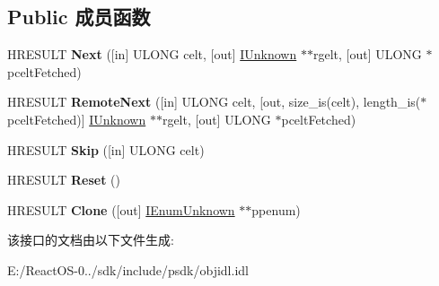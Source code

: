 \subsection*{Public 成员函数}
\begin{DoxyCompactItemize}
\item 
\mbox{\label{interface_i_enum_unknown_a34c47ba6e0eb6153b6abc51c7b7181e5}} 
H\+R\+E\+S\+U\+LT {\bfseries Next} (\mbox{[}in\mbox{]} U\+L\+O\+NG celt, \mbox{[}out\mbox{]} \hyperlink{interface_i_unknown}{I\+Unknown} $\ast$$\ast$rgelt, \mbox{[}out\mbox{]} U\+L\+O\+NG $\ast$pcelt\+Fetched)
\item 
\mbox{\label{interface_i_enum_unknown_a37f68489ee09f2c4be1ec67098a4ee74}} 
H\+R\+E\+S\+U\+LT {\bfseries Remote\+Next} (\mbox{[}in\mbox{]} U\+L\+O\+NG celt, \mbox{[}out, size\+\_\+is(celt), length\+\_\+is($\ast$pcelt\+Fetched)\mbox{]} \hyperlink{interface_i_unknown}{I\+Unknown} $\ast$$\ast$rgelt, \mbox{[}out\mbox{]} U\+L\+O\+NG $\ast$pcelt\+Fetched)
\item 
\mbox{\label{interface_i_enum_unknown_a0d9717b7381d8afc539cf6bbb3330e2f}} 
H\+R\+E\+S\+U\+LT {\bfseries Skip} (\mbox{[}in\mbox{]} U\+L\+O\+NG celt)
\item 
\mbox{\label{interface_i_enum_unknown_ab01f2f09a73e05a52f0e5164530fb61b}} 
H\+R\+E\+S\+U\+LT {\bfseries Reset} ()
\item 
\mbox{\label{interface_i_enum_unknown_ab380d2be4f1a7b8476b40d8c59fc7fc6}} 
H\+R\+E\+S\+U\+LT {\bfseries Clone} (\mbox{[}out\mbox{]} \hyperlink{interface_i_enum_unknown}{I\+Enum\+Unknown} $\ast$$\ast$ppenum)
\end{DoxyCompactItemize}


该接口的文档由以下文件生成\+:\begin{DoxyCompactItemize}
\item 
E\+:/\+React\+O\+S-\/0../sdk/include/psdk/objidl.\+idl\end{DoxyCompactItemize}
